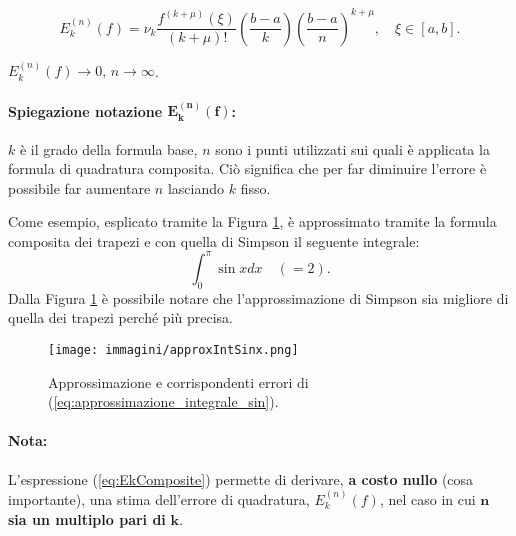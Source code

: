 \begin{definition}
	\begin{equation}\label{eq:EkComposite}
 E_k^{(n)}(f)=\nu_k\frac{f^{(k+\mu)}(\xi)}{(k+\mu)!}\left(\frac{b-a}{k}\right)\left(\frac{b-a}{n}\right)^{k+\mu}, \quad \xi\in[a,b].
\end{equation}
\end{definition}

\begin{remark}
	$E_k^{(n)}(f)\rightarrow 0,\, n\rightarrow\infty$.
\end{remark}

\paragraph{Spiegazione notazione $\boldsymbol{E_k^{(n)}(f)}$:} $k$ è il grado della formula base, $n$ sono i punti utilizzati sui quali è applicata la formula di quadratura composita. Ciò significa che per far diminuire l'errore è possibile far aumentare $n$ lasciando $k$ fisso.

\begin{example}\label{example:approssimazione_integrale_sin}
    Come esempio, esplicato tramite la Figura \ref{fig:approxIntSinx}, è approssimato tramite la formula composita dei trapezi e con quella di Simpson il seguente integrale:
    \begin{equation}\label{eq:approssimazione_integrale_sin}
        \int_0^\pi \sin{x}dx\quad (=2).
    \end{equation}
    Dalla Figura \ref{fig:approxIntSinx} è possibile notare che l'approssimazione di Simpson sia migliore di quella dei trapezi perché più precisa.
\end{example}

\begin{figure}
    \centering
    \texttt{[image: immagini/approxIntSinx.png]}
    \caption{Approssimazione e corrispondenti errori di (\ref{eq:approssimazione_integrale_sin}).}\label{fig:approxIntSinx}
\end{figure}

\paragraph{Nota:} L'espressione (\ref{eq:EkComposite}) permette di derivare, \textbf{a costo nullo} (cosa importante), una stima dell'errore di quadratura, $E_k^{(n)}(f)$, nel caso in cui $\boldsymbol n$ \textbf{sia un multiplo pari di} $\boldsymbol k$.

